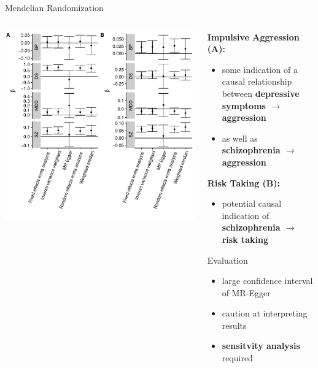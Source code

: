 \documentclass{beamer}
\begin{document}
\begin{frame}[t]{Mendelian Randomization}
  \tiny
  \begin{columns}[T]
    \begin{column}[T]{0.6\textwidth}
      \centering
      \includegraphics[width=0.99\linewidth]{../ukb_psychiatric/figures/overall_mr_effect.pdf}
    \end{column}
    \begin{column}[T]{0.5\textwidth}

      \textbf{Impulsive Aggression (A):}\\
      \begin{itemize}
        \item some indication of a causal relationship between \textbf{depressive symptoms $\rightarrow$ aggression } 
        \item as well as \textbf{schizophrenia $\rightarrow$ aggression}
      \end{itemize}

      \textbf{Risk Taking (B):}\\
      \begin{itemize}
        \item potential causal indication of \\ \textbf{schizophrenia $\rightarrow$ risk taking} 
      \end{itemize}

      \begin{block}{\tiny Evaluation}
        \begin{itemize}
          \item large confidence interval of MR-Egger
          \item caution at interpreting results
          \item \textbf{sensitvity analysis} required
        \end{itemize}
      \end{block} 
    \end{column}
  \end{columns}
\end{frame}
\end{document}
